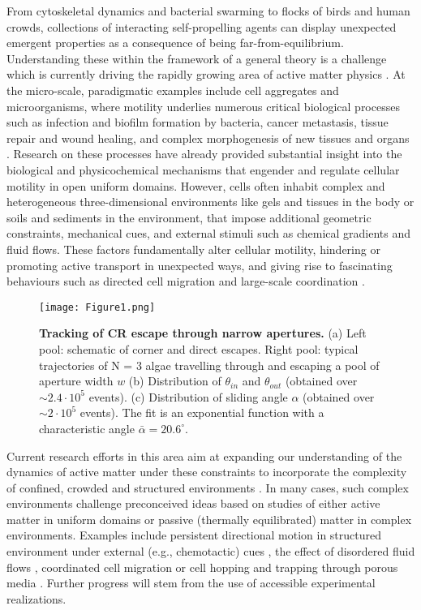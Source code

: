 \documentclass[aps,showpacs,superscriptaddress,amsfonts,twocolumn,prl]{revtex4}
\begin{document}
From cytoskeletal dynamics and bacterial swarming to flocks of birds and human crowds, collections of interacting self-propelling agents can display unexpected emergent properties as a consequence of being far-from-equilibrium. Understanding these within the framework of a general theory is a challenge which is currently driving the rapidly growing area of active matter physics \cite{Marchetti2013}. At the micro-scale, paradigmatic examples include cell aggregates and microorganisms, where motility underlies numerous critical biological processes such as infection and biofilm formation by bacteria, cancer metastasis, tissue repair and wound healing, and complex morphogenesis of new tissues and organs \cite{Hartmann2019,Needleman2017,Collinet2021}. Research on these processes have already provided substantial insight into the biological and physicochemical mechanisms that engender and regulate cellular motility in open uniform domains. However, cells often inhabit complex and heterogeneous three-dimensional environments like gels and tissues in the body or soils and sediments in the environment, that impose additional geometric constraints, mechanical cues, and external stimuli such as chemical gradients and fluid flows. These factors fundamentally alter cellular motility, hindering or promoting active transport in unexpected ways, and giving rise to fascinating behaviours such as directed cell migration and large-scale coordination \cite{Bricard2013,Rein2016}.

\begin{figure}[hb]
	\texttt{[image: Figure1.png]}
	\caption{\label{fig:Schematic} \textbf{Tracking of CR escape through narrow apertures.} (a) Left pool: schematic of corner and direct escapes. Right pool: typical trajectories of N = 3 algae travelling through and escaping a pool of aperture width $w$ (b) Distribution of $\theta_{in}$ and $\theta_{out}$ (obtained over $\sim 2.4\cdot10^5$ events). (c) Distribution of sliding angle $\alpha$ (obtained over $\sim 2\cdot10^5$ events). The fit is an exponential function with a characteristic angle	$\bar{\alpha}=20.6^{\circ}$.}
\end{figure}

Current research efforts in this area aim at expanding our understanding of the dynamics of active matter under these constraints to incorporate the complexity of confined, crowded and structured environments \cite{Bechinger2016}. In many cases, such complex environments challenge preconceived ideas based on studies of either active matter in uniform domains or passive (thermally equilibrated) matter in complex environments. Examples include persistent directional motion in structured environment under external (e.g.,  chemotactic) cues \cite{Phan2020}, the effect of disordered fluid flows \cite{DeAnna2021}, coordinated cell migration \cite{Bruckner2021, Renkawitz2019} or cell hopping and trapping through porous media \cite{Bhattacharjee2019b}. Further progress will stem from the use of accessible experimental realizations.
\end{document}
